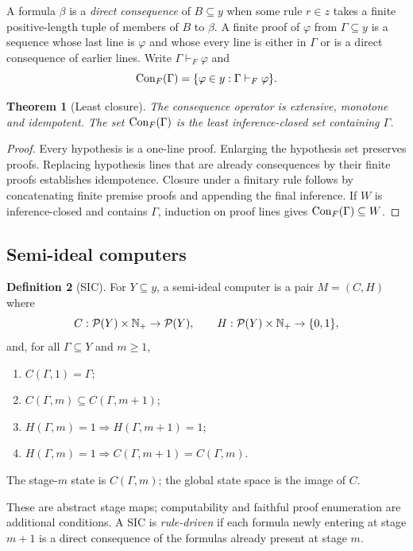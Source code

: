 \documentclass[11pt,letterpaper]{article}
\newtheorem{theorem}{Theorem}[section]\newtheorem{proposition}[theorem]{Proposition}\newtheorem{lemma}[theorem]{Lemma}\newtheorem{corollary}[theorem]{Corollary}\newtheorem{conjecture}[theorem]{Conjecture}\theoremstyle{definition}\newtheorem{definition}[theorem]{Definition}\newtheorem{example}[theorem]{Example}\newtheorem{remark}[theorem]{Remark}
\begin{document}
A formula $\beta$ is a \emph{direct consequence} of $B\subseteq y$ when some rule $r\in z$ takes a finite positive-length tuple of members of $B$ to $\beta$. A finite proof of $\varphi$ from $\Gamma\subseteq y$ is a sequence whose last line is $\varphi$ and whose every line is either in $\Gamma$ or is a direct consequence of earlier lines. Write $\Gamma\vdash_F\varphi$ and
\[
\operatorname{Con}_F(\Gamma)=\{\varphi\in y:\Gamma\vdash_F\varphi\}.
\]
\begin{theorem}[Least closure]
The consequence operator is extensive, monotone and idempotent. The set $\operatorname{Con}_F(\Gamma)$ is the least inference-closed set containing $\Gamma$.
\end{theorem}
\begin{proof}
Every hypothesis is a one-line proof. Enlarging the hypothesis set preserves proofs. Replacing hypothesis lines that are already consequences by their finite proofs establishes idempotence. Closure under a finitary rule follows by concatenating finite premise proofs and appending the final inference. If $W$ is inference-closed and contains $\Gamma$, induction on proof lines gives $\operatorname{Con}_F(\Gamma)\subseteq W$.
\end{proof}

\subsection{Semi-ideal computers}
\begin{definition}[SIC]
For $Y\subseteq y$, a semi-ideal computer is a pair $M=(C,H)$ where
\[
C:\mathcal P(Y)\times\mathbb N_{+}\to\mathcal P(Y),\qquad H:\mathcal P(Y)\times\mathbb N_{+}\to\{0,1\},
\]
and, for all $\Gamma\subseteq Y$ and $m\ge1$,
\begin{enumerate}
\item $C(\Gamma,1)=\Gamma$;
\item $C(\Gamma,m)\subseteq C(\Gamma,m+1)$;
\item $H(\Gamma,m)=1\Rightarrow H(\Gamma,m+1)=1$;
\item $H(\Gamma,m)=1\Rightarrow C(\Gamma,m+1)=C(\Gamma,m)$.
\end{enumerate}
The stage-$m$ state is $C(\Gamma,m)$; the global state space is the image of $C$.
\end{definition}
These are abstract stage maps; computability and faithful proof enumeration are additional conditions. A SIC is \emph{rule-driven} if each formula newly entering at stage $m+1$ is a direct consequence of the formulas already present at stage $m$.
\end{document}

